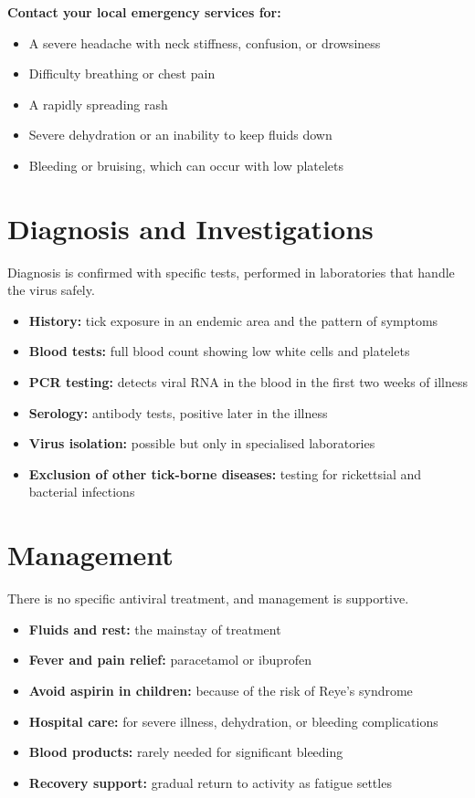 \textbf{Contact your local emergency services for:}
\begin{itemize}
    \item A severe headache with neck stiffness, confusion, or drowsiness
    \item Difficulty breathing or chest pain
    \item A rapidly spreading rash
    \item Severe dehydration or an inability to keep fluids down
    \item Bleeding or bruising, which can occur with low platelets
\end{itemize}

\section*{Diagnosis and Investigations}
Diagnosis is confirmed with specific tests, performed in laboratories that handle the virus safely.

\begin{itemize}
    \item \textbf{History:} tick exposure in an endemic area and the pattern of symptoms
    \item \textbf{Blood tests:} full blood count showing low white cells and platelets
    \item \textbf{PCR testing:} detects viral RNA in the blood in the first two weeks of illness
    \item \textbf{Serology:} antibody tests, positive later in the illness
    \item \textbf{Virus isolation:} possible but only in specialised laboratories
    \item \textbf{Exclusion of other tick-borne diseases:} testing for rickettsial and bacterial infections
\end{itemize}

\section*{Management}
There is no specific antiviral treatment, and management is supportive.

\begin{itemize}
    \item \textbf{Fluids and rest:} the mainstay of treatment
    \item \textbf{Fever and pain relief:} paracetamol or ibuprofen
    \item \textbf{Avoid aspirin in children:} because of the risk of Reye's syndrome
    \item \textbf{Hospital care:} for severe illness, dehydration, or bleeding complications
    \item \textbf{Blood products:} rarely needed for significant bleeding
    \item \textbf{Recovery support:} gradual return to activity as fatigue settles
\end{itemize}

